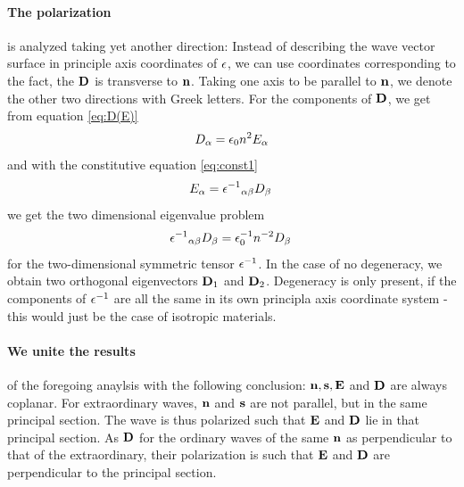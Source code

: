 \paragraph{The polarization} is analyzed taking yet another direction: 
Instead of describing the wave vector surface in principle axis 
coordinates of $\epsilon$, we can use coordinates corresponding to 
the fact, the $\mathbf{D}$ is transverse to $\mathbf{n}$. Taking one axis to be 
parallel to $\mathbf{n}$, we denote the other two directions with Greek letters. 
For the components of $\mathbf{D}$, we get from equation \eqref{eq:D(E)}
\begin{equation}
    D_\alpha = \epsilon_0 n^2 E_\alpha
\end{equation}
and with the constitutive equation \eqref{eq:const1} 
\begin{equation}
    E_\alpha = {\epsilon^{-1}}_{\alpha \beta} D_\beta \, 
\end{equation}
we get the two dimensional eigenvalue problem
\begin{equation}
    {\epsilon^{-1}}_{\alpha \beta} D_\beta = \epsilon_0^{-1} n^{-2} D_\beta \,
\end{equation}
for the two-dimensional symmetric tensor $\epsilon^{-1}$. 
In the case of no degeneracy, we obtain two orthogonal eigenvectors 
$\mathbf{D}_1$ and $\mathbf{D}_2$. Degeneracy is only present, if the components of 
$\epsilon^{-1}$ are all the same in its own principla axis coordinate system - 
this would just be the case of isotropic materials. 


\paragraph{We unite the results} of the foregoing anaylsis with the 
following conclusion: 
$\mathbf{n}, \mathbf{s}, \mathbf{E}$ and $\mathbf{D}$ are always coplanar. For extraordinary waves, 
$\mathbf{n}$ and $\mathbf{s}$ are not parallel, but in the same principal section. 
The wave is thus polarized such that $\mathbf{E}$ and $\mathbf{D}$ lie in that principal 
section. As $\mathbf{D}$ for the ordinary waves of the same $\mathbf{n}$ as perpendicular 
to that of the extraordinary, their polarization is such that 
$\mathbf{E}$ and $\mathbf{D}$ are perpendicular to the principal section. 

